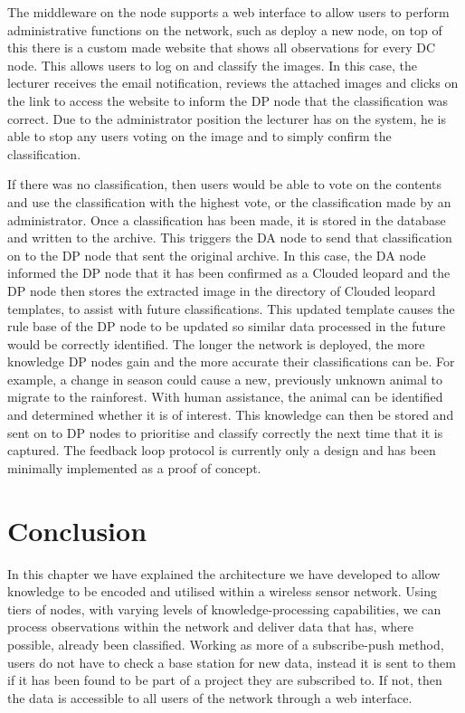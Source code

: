			The middleware on the node supports a web interface to allow users to perform administrative functions on the network, such as deploy a new node, on top of this there is a custom made website that shows all observations for every DC node. This allows users to log on and classify the images. In this case, the lecturer receives the email notification, reviews the attached images and clicks on the link to access the website to inform the DP node that the classification was correct. Due to the administrator position the lecturer has on the system, he is able to stop any users voting on the image and to simply confirm the classification.
			
			If there was no classification, then users would be able to vote on the contents and use the classification with the highest vote, or the classification made by an administrator. Once a classification has been made, it is stored in the database and written to the archive. This triggers the DA node to send that classification on to the DP node that sent the original archive. In this case, the DA node informed the DP node that it has been confirmed as a Clouded leopard and the DP node then stores the extracted image in the directory of Clouded leopard templates, to assist with future classifications. This updated template causes the rule base of the DP node to be updated so similar data processed in the future would be correctly identified. The longer the network is deployed, the more knowledge DP nodes gain and the more accurate their classifications can be. For example, a change in season could cause a new, previously unknown animal to migrate to the rainforest. With human assistance, the animal can be identified and determined whether it is of interest. This knowledge can then be stored and sent on to DP nodes to prioritise and classify correctly the next time that it is captured. The feedback loop protocol is currently only a design and has been minimally implemented as a proof of concept.
					
	\section{Conclusion}\label{arch:conc}
		In this chapter we have explained the architecture we have developed to allow knowledge to be encoded and utilised within a wireless sensor network. Using tiers of nodes, with varying levels of knowledge-processing capabilities, we can process observations within the network and deliver data that has, where possible, already been classified. Working as more of a subscribe-push method, users do not have to check a base station for new data, instead it is sent to them if it has been found to be part of a project they are subscribed to. If not, then the data is accessible to all users of the network through a web interface.
		
